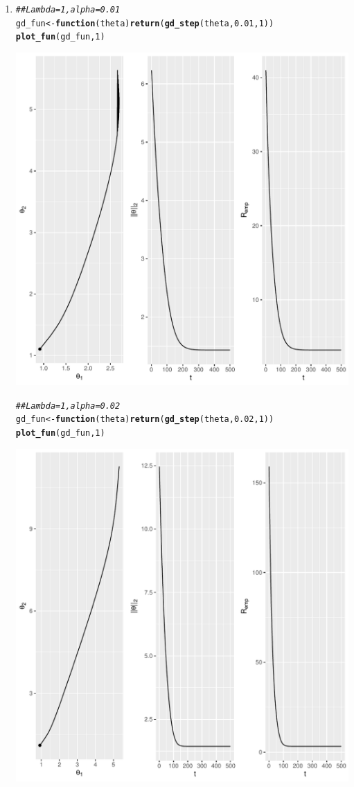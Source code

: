 \documentclass[a4paper]{article}
\makeatletter
\newcommand{\hlnum}[1]{\textcolor[rgb]{0.686,0.059,0.569}{#1}}%
\newcommand{\hlcom}[1]{\textcolor[rgb]{0.678,0.584,0.686}{\textit{#1}}}%
\newcommand{\hlstd}[1]{\textcolor[rgb]{0.345,0.345,0.345}{#1}}%
\newcommand{\hlkwa}[1]{\textcolor[rgb]{0.161,0.373,0.58}{\textbf{#1}}}%
\newcommand{\hlkwb}[1]{\textcolor[rgb]{0.69,0.353,0.396}{#1}}%
\newcommand{\hlkwc}[1]{\textcolor[rgb]{0.333,0.667,0.333}{#1}}%
\newcommand{\hlkwd}[1]{\textcolor[rgb]{0.737,0.353,0.396}{\textbf{#1}}}%
\newenvironment{kframe}{%
 \def\at@end@of@kframe{}%
 \ifinner\ifhmode%
  \def\at@end@of@kframe{\end{minipage}}%
  \begin{minipage}{\columnwidth}%
 \fi\fi%
 \def\FrameCommand##1{\hskip\@totalleftmargin \hskip-\fboxsep
 \colorbox{shadecolor}{##1}\hskip-\fboxsep
     \hskip-\linewidth \hskip-\@totalleftmargin \hskip\columnwidth}%
 \MakeFramed {\advance\hsize-\width
   \@totalleftmargin\z@ \linewidth\hsize
   \@setminipage}}%
 {\par\unskip\endMakeFramed%
 \at@end@of@kframe}
\newenvironment{knitrout}{}{} %
\makeatother
\begin{document}
{\begin{enumerate}
Gradient descent will in theory not converge since $\mathcal{R}_\text{emp}$ has no minimum (a)
\item

\begin{knitrout}
\color{fgcolor}\begin{kframe}
\begin{alltt}
\hlcom{## Lambda = 1, alpha = 0.01}
\hlstd{gd_fun} \hlkwb{<-} \hlkwa{function}\hlstd{(}\hlkwc{theta}\hlstd{)} \hlkwd{return}\hlstd{(}\hlkwd{gd_step}\hlstd{(theta,} \hlnum{0.01}\hlstd{,} \hlnum{1}\hlstd{))}
\hlkwd{plot_fun}\hlstd{(gd_fun,} \hlnum{1}\hlstd{)}
\end{alltt}
\end{kframe}
\includegraphics[width=0.5\linewidth]{figure/mv-plot_gd_step_reg-1} 
\begin{kframe}\begin{alltt}
\hlcom{## Lambda = 1, alpha = 0.02}
\hlstd{gd_fun} \hlkwb{<-} \hlkwa{function}\hlstd{(}\hlkwc{theta}\hlstd{)} \hlkwd{return}\hlstd{(}\hlkwd{gd_step}\hlstd{(theta,} \hlnum{0.02}\hlstd{,} \hlnum{1}\hlstd{))}
\hlkwd{plot_fun}\hlstd{(gd_fun,} \hlnum{1}\hlstd{)}
\end{alltt}
\end{kframe}
\includegraphics[width=0.5\linewidth]{figure/mv-plot_gd_step_reg-2} 
\end{knitrout}


\end{enumerate}}
\end{document}
